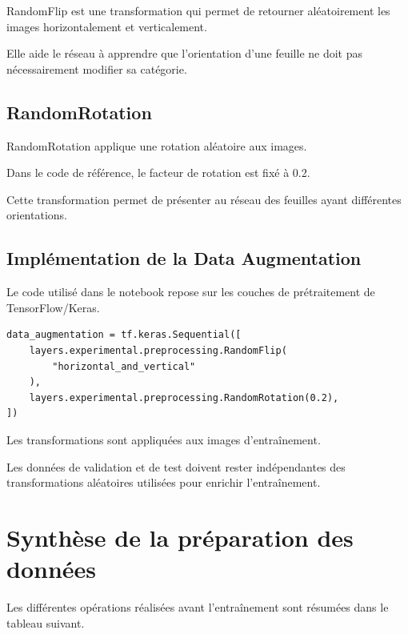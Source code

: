 \documentclass[12pt,a4paper,oneside]{report}
\begin{document}
RandomFlip est une transformation qui permet de retourner
aléatoirement les images horizontalement et verticalement.

Elle aide le réseau à apprendre que l'orientation d'une
feuille ne doit pas nécessairement modifier sa catégorie.

\subsection{RandomRotation}

RandomRotation applique une rotation aléatoire aux images.

Dans le code de référence, le facteur de rotation
est fixé à 0.2.

Cette transformation permet de présenter au réseau
des feuilles ayant différentes orientations.

\subsection{Implémentation de la Data Augmentation}

Le code utilisé dans le notebook repose sur les couches
de prétraitement de TensorFlow/Keras.

\begin{verbatim}
data_augmentation = tf.keras.Sequential([
    layers.experimental.preprocessing.RandomFlip(
        "horizontal_and_vertical"
    ),
    layers.experimental.preprocessing.RandomRotation(0.2),
])
\end{verbatim}

Les transformations sont appliquées aux images
d'entraînement.

Les données de validation et de test doivent rester
indépendantes des transformations aléatoires utilisées
pour enrichir l'entraînement.

\section{Synthèse de la préparation des données}

Les différentes opérations réalisées avant l'entraînement
sont résumées dans le tableau suivant.
\end{document}
